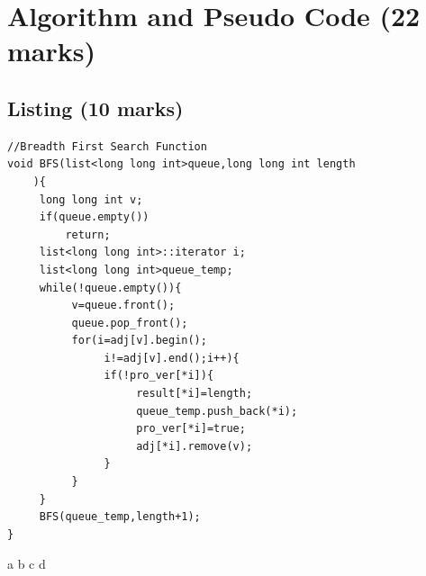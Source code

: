 \documentclass[a4paper,12pt]{article}
\begin{document}
\pagebreak
\section{\textbf{Algorithm and Pseudo Code (22 marks)}}
\subsection{\textbf{Listing (10 marks)}}
\begin{lstlisting}
//Breadth First Search Function
void BFS(list<long long int>queue,long long int length
    ){
     long long int v;
     if(queue.empty())
         return; 
     list<long long int>::iterator i;
     list<long long int>queue_temp;
     while(!queue.empty()){
          v=queue.front();
          queue.pop_front();
          for(i=adj[v].begin();
               i!=adj[v].end();i++){
               if(!pro_ver[*i]){
                    result[*i]=length;
                    queue_temp.push_back(*i);
                    pro_ver[*i]=true;
                    adj[*i].remove(v);
               }
          }
     }
     BFS(queue_temp,length+1);
}
\end{lstlisting}
\pagebreak
\begin{thebibliography}{9}
 a
 b
 c
 d

\end{thebibliography}
\end{document}
